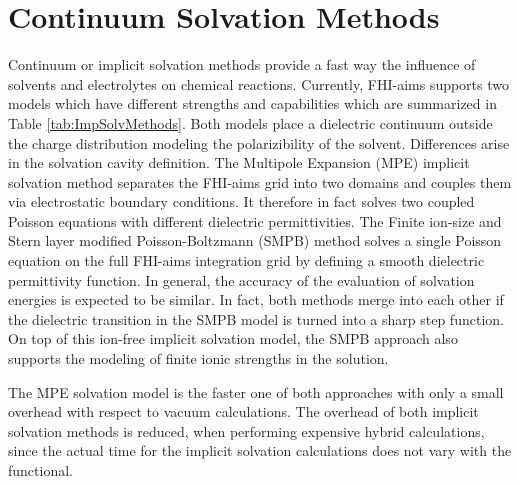 \section{Continuum Solvation Methods}
\label{Sec:ContSolvMethods}

Continuum or implicit solvation methods provide a fast way the influence of solvents and electrolytes on chemical reactions. Currently, FHI-aims supports two models which have different strengths and capabilities which are summarized in Table \ref{tab:ImpSolvMethods}. Both models place a dielectric continuum outside the charge distribution modeling the polarizibility of the solvent. Differences arise in the solvation cavity definition. The Multipole Expansion (MPE) implicit solvation method separates the FHI-aims grid into two domains and couples them via electrostatic boundary conditions. It therefore in fact solves two coupled Poisson equations with different dielectric permittivities. The Finite ion-size and Stern layer modified Poisson-Boltzmann (SMPB) method solves a single Poisson equation on the full FHI-aims integration grid by defining a smooth dielectric permittivity function.  In general, the accuracy of the evaluation of solvation energies is expected to be similar. In fact, both methods  merge into each other if the dielectric transition in the SMPB model is turned into a sharp step function. On top of this ion-free implicit solvation model, the SMPB approach also supports the modeling of finite ionic strengths in the solution.

The MPE solvation model is the faster one of both approaches with only a small overhead with respect to vacuum calculations. The overhead of both implicit solvation methods is reduced, when performing expensive hybrid calculations, since the actual time for the implicit solvation calculations does not vary with the functional.

